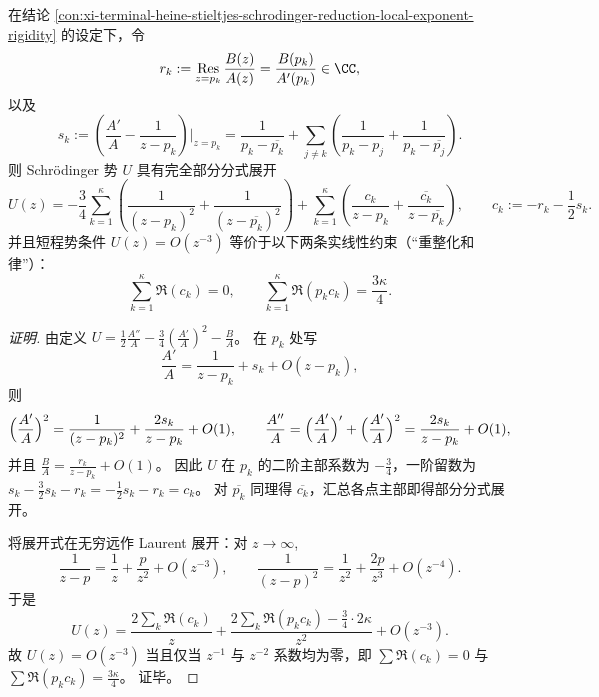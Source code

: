 \begin{conclusion}\label{con:xi-terminal-heine-stieltjes-pole-expansion-renormalization-sum-rules}
在结论 \ref{con:xi-terminal-heine-stieltjes-schrodinger-reduction-local-exponent-rigidity} 的设定下，令
\[
r_k:=\operatorname*{Res}_{z=p_k}\frac{B(z)}{A(z)}=\frac{B(p_k)}{A'(p_k)}\in\CC,
\]
以及
\[
s_k:=\left(\frac{A'}{A}-\frac{1}{z-p_k}\right)\Big|_{z=p_k}
=\frac{1}{p_k-\overline{p_k}}+\sum_{j\ne k}\left(\frac{1}{p_k-p_j}+\frac{1}{p_k-\overline{p_j}}\right).
\]
则 Schr\"odinger 势 \(U\) 具有完全部分分式展开
\[
U(z)=
-\frac34\sum_{k=1}^{\kappa}\left(\frac{1}{(z-p_k)^2}+\frac{1}{(z-\overline{p_k})^2}\right)
+\sum_{k=1}^{\kappa}\left(\frac{c_k}{z-p_k}+\frac{\overline{c_k}}{z-\overline{p_k}}\right),
\qquad
c_k:=-r_k-\frac12 s_k.
\]
并且短程势条件 \(U(z)=O(z^{-3})\) 等价于以下两条实线性约束（“重整化和律”）：
\[
\sum_{k=1}^{\kappa}\Re(c_k)=0,
\qquad
\sum_{k=1}^{\kappa}\Re(p_k c_k)=\frac{3\kappa}{4}.
\]
\end{conclusion}
\begin{proof}[证明]
由定义
\(
U=\frac12\frac{A''}{A}-\frac34(\frac{A'}{A})^2-\frac{B}{A}
\)。
在 \(p_k\) 处写
\[
\frac{A'}{A}=\frac{1}{z-p_k}+s_k+O(z-p_k),
\]
则
\[
\Bigl(\frac{A'}{A}\Bigr)^2=\frac{1}{(z-p_k)^2}+\frac{2s_k}{z-p_k}+O(1),
\qquad
\frac{A''}{A}=\Bigl(\frac{A'}{A}\Bigr)'+\Bigl(\frac{A'}{A}\Bigr)^2=\frac{2s_k}{z-p_k}+O(1),
\]
并且
\(
\frac{B}{A}=\frac{r_k}{z-p_k}+O(1)
\)。
因此 \(U\) 在 \(p_k\) 的二阶主部系数为 \(-\tfrac34\)，一阶留数为
\(
s_k-\tfrac32 s_k-r_k=-\tfrac12 s_k-r_k=c_k
\)。
对 \(\overline{p_k}\) 同理得 \(\overline{c_k}\)，汇总各点主部即得部分分式展开。
\par
将展开式在无穷远作 Laurent 展开：对 \(z\to\infty\),
\[
\frac{1}{z-p}=\frac{1}{z}+\frac{p}{z^{2}}+O(z^{-3}),
\qquad
\frac{1}{(z-p)^2}=\frac{1}{z^{2}}+\frac{2p}{z^{3}}+O(z^{-4}).
\]
于是
\[
U(z)=\frac{2\sum_k \Re(c_k)}{z}
+\frac{2\sum_k\Re(p_k c_k)-\frac34\cdot 2\kappa}{z^{2}}
+O(z^{-3}).
\]
故 \(U(z)=O(z^{-3})\) 当且仅当 \(z^{-1}\) 与 \(z^{-2}\) 系数均为零，即
\(
\sum\Re(c_k)=0
\)
与
\(
\sum\Re(p_k c_k)=\tfrac{3\kappa}{4}
\)。
证毕。
\end{proof}

